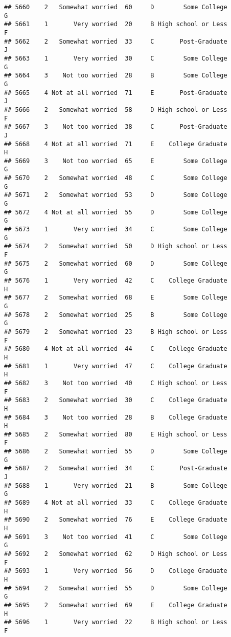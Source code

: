 \documentclass[
]{article}
\begin{document}
\begin{verbatim}
## 5660    2   Somewhat worried  60     D        Some College         G
## 5661    1       Very worried  20     B High school or Less         F
## 5662    2   Somewhat worried  33     C       Post-Graduate         J
## 5663    1       Very worried  30     C        Some College         G
## 5664    3    Not too worried  28     B        Some College         G
## 5665    4 Not at all worried  71     E       Post-Graduate         J
## 5666    2   Somewhat worried  58     D High school or Less         F
## 5667    3    Not too worried  38     C       Post-Graduate         J
## 5668    4 Not at all worried  71     E    College Graduate         H
## 5669    3    Not too worried  65     E        Some College         G
## 5670    2   Somewhat worried  48     C        Some College         G
## 5671    2   Somewhat worried  53     D        Some College         G
## 5672    4 Not at all worried  55     D        Some College         G
## 5673    1       Very worried  34     C        Some College         G
## 5674    2   Somewhat worried  50     D High school or Less         F
## 5675    2   Somewhat worried  60     D        Some College         G
## 5676    1       Very worried  42     C    College Graduate         H
## 5677    2   Somewhat worried  68     E        Some College         G
## 5678    2   Somewhat worried  25     B        Some College         G
## 5679    2   Somewhat worried  23     B High school or Less         F
## 5680    4 Not at all worried  44     C    College Graduate         H
## 5681    1       Very worried  47     C    College Graduate         H
## 5682    3    Not too worried  40     C High school or Less         F
## 5683    2   Somewhat worried  30     C    College Graduate         H
## 5684    3    Not too worried  28     B    College Graduate         H
## 5685    2   Somewhat worried  80     E High school or Less         F
## 5686    2   Somewhat worried  55     D        Some College         G
## 5687    2   Somewhat worried  34     C       Post-Graduate         J
## 5688    1       Very worried  21     B        Some College         G
## 5689    4 Not at all worried  33     C    College Graduate         H
## 5690    2   Somewhat worried  76     E    College Graduate         H
## 5691    3    Not too worried  41     C        Some College         G
## 5692    2   Somewhat worried  62     D High school or Less         F
## 5693    1       Very worried  56     D    College Graduate         H
## 5694    2   Somewhat worried  55     D        Some College         G
## 5695    2   Somewhat worried  69     E    College Graduate         H
## 5696    1       Very worried  22     B High school or Less         F

\end{verbatim}
\end{document}
